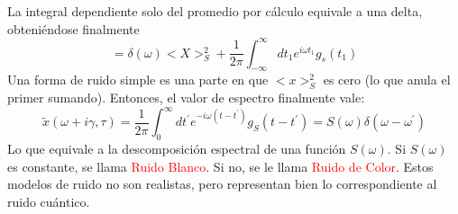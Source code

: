 \documentclass{book}
\begin{document}
La integral dependiente solo del promedio por cálculo equivale a una delta, obteniéndose finalmente
\begin{equation}\label{eq7.24}=\delta(\omega)<X>_S^2+\frac{1}{2\pi}\int_{-\infty}^{\infty} dt_1 e^{i\omega t_1}g_s(t_1)\end{equation}
Una forma de ruido simple es una parte en que $<x>_S^2$ es cero (lo que anula el primer sumando). Entonces, el valor de espectro finalmente vale:
\begin{equation}\label{eq7.25}\tilde{x}(\omega+i\gamma,\tau)=\frac{1}{2\pi}\int_0^\infty dt^\prime e^{-i\omega(t-t^\prime)}g_S(t-t^\prime)=S(\omega)\delta(\omega-\omega^\prime)\end{equation}
Lo que equivale a la descomposición espectral de una función $S(\omega)$. Si $S(\omega)$ es constante, se llama \textcolor{red}{Ruido Blanco}. Si no, se le llama \textcolor{red}{Ruido de Color}. Estos modelos de ruido no son realistas, pero representan bien lo correspondiente al ruido cuántico.
\end{document}
